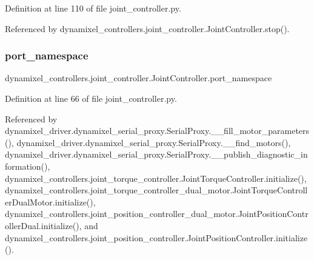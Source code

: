 Definition at line 110 of file joint\+\_\+controller.\+py.



Referenced by dynamixel\+\_\+controllers.\+joint\+\_\+controller.\+Joint\+Controller.\+stop().

\mbox{\label{classdynamixel__controllers_1_1joint__controller_1_1_joint_controller_ac89de71afa48761fb662ac2917a5b9d3}} 
\subsubsection{\texorpdfstring{port\+\_\+namespace}{port\_namespace}}
{\footnotesize\ttfamily dynamixel\+\_\+controllers.\+joint\+\_\+controller.\+Joint\+Controller.\+port\+\_\+namespace\hspace{0.3cm}{\ttfamily [inherited]}}



Definition at line 66 of file joint\+\_\+controller.\+py.



Referenced by dynamixel\+\_\+driver.\+dynamixel\+\_\+serial\+\_\+proxy.\+Serial\+Proxy.\+\_\+\+\_\+fill\+\_\+motor\+\_\+parameters(), dynamixel\+\_\+driver.\+dynamixel\+\_\+serial\+\_\+proxy.\+Serial\+Proxy.\+\_\+\+\_\+find\+\_\+motors(), dynamixel\+\_\+driver.\+dynamixel\+\_\+serial\+\_\+proxy.\+Serial\+Proxy.\+\_\+\+\_\+publish\+\_\+diagnostic\+\_\+information(), dynamixel\+\_\+controllers.\+joint\+\_\+torque\+\_\+controller.\+Joint\+Torque\+Controller.\+initialize(), dynamixel\+\_\+controllers.\+joint\+\_\+torque\+\_\+controller\+\_\+dual\+\_\+motor.\+Joint\+Torque\+Controller\+Dual\+Motor.\+initialize(), dynamixel\+\_\+controllers.\+joint\+\_\+position\+\_\+controller\+\_\+dual\+\_\+motor.\+Joint\+Position\+Controller\+Dual.\+initialize(), and dynamixel\+\_\+controllers.\+joint\+\_\+position\+\_\+controller.\+Joint\+Position\+Controller.\+initialize().


